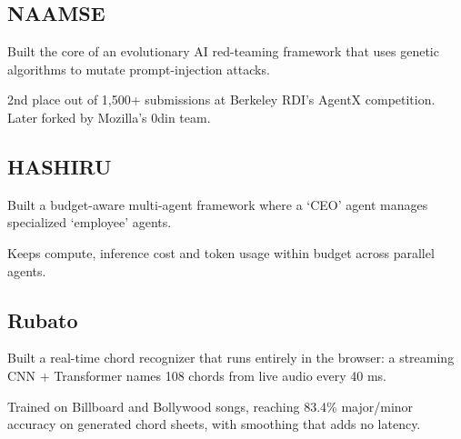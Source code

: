 \documentclass[]{deedy-resume-openfont}
\begin{document}
\subsection*{NAAMSE}
\vspace{\topsep}
\begin{tightemize}
\item Built the core of an evolutionary AI red-teaming framework that uses genetic algorithms to mutate prompt-injection attacks.
\item 2nd place out of 1,500+ submissions at Berkeley RDI's AgentX competition. Later forked by Mozilla's 0din team.
\end{tightemize}
\sectionsep

\subsection*{HASHIRU}
\vspace{\topsep}
\begin{tightemize}
\item Built a budget-aware multi-agent framework where a `CEO' agent manages specialized `employee' agents.
\item Keeps compute, inference cost and token usage within budget across parallel agents.
\end{tightemize}
\sectionsep

\subsection*{Rubato}
\vspace{\topsep}
\begin{tightemize}
\item Built a real-time chord recognizer that runs entirely in the browser: a streaming CNN + Transformer names 108 chords from live audio every 40 ms.
\item Trained on Billboard and Bollywood songs, reaching 83.4\% major/minor accuracy on generated chord sheets, with smoothing that adds no latency.
\end{tightemize}
\sectionsep
\end{document}
